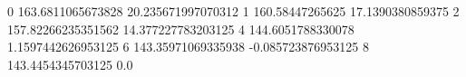 0 163.6811065673828 20.235671997070312
1 160.58447265625 17.1390380859375
2 157.82266235351562 14.377227783203125
4 144.6051788330078 1.1597442626953125
6 143.35971069335938 -0.085723876953125
8 143.4454345703125 0.0
